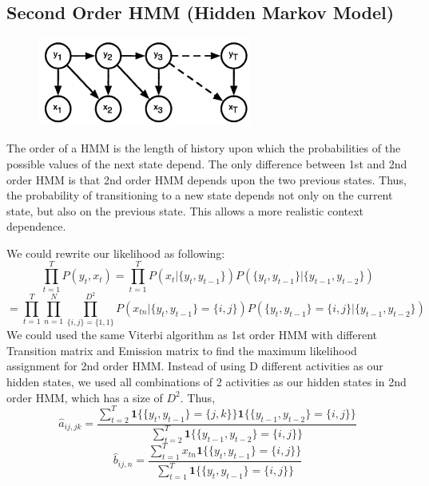 \documentclass[10pt,letter]{article}
\numberwithin{equation}{section} %
\numberwithin{figure}{section} %
\numberwithin{table}{section} %
\begin{document}
\subsection{Second Order HMM (Hidden Markov Model)}

\begin{figure}[h]
    \centering
\includegraphics[width=7cm]{../plot/2hmm}
\end{figure}

The order of a HMM is the length of history upon which the probabilities of the possible values of the next state depend. The only difference between 1st and 2nd order HMM is that 2nd order HMM depends upon the two previous states. Thus, the probability of transitioning to a new state depends not only on the current state, but also on the previous state. This allows a more realistic context dependence.

We could rewrite our likelihood as following:
$$ \prod_{t=1}^{T} P(y_t, x_t) = \prod_{t=1}^T P(x_t|\{y_t, y_{t-1}\})P(\{y_t,y_{t-1}\}|\{y_{t-1},y_{t-2}\})$$
$$=\prod_{t=1}^T\prod_{n=1}^N\prod_{\{i,j\}=\{1,1\}}^{D^2} P(x_{tn}|\{y_t, y_{t-1}\} = \{i,j\})P(\{y_t, y_{t-1}\} = \{i,j\}|\{y_{t-1}, y_{t-2}\}) $$
We could used the same Viterbi algorithm as 1st order HMM with different Transition matrix and Emission matrix to find the maximum likelihood assignment for 2nd order HMM. 
Instead of using D different activities as our hidden states, we used all combinations of 2 activities as our hidden states in 2nd order HMM, which has a size of $D^2$. Thus,
$$\hat{a}_{ij, jk} = \frac{\sum_{t=2}^T \mathbf{1}\{\{y_t,y_{t-1}\}=\{j,k\}\}\mathbf{1}\{\{y_{t-1},y_{t-2}\}=\{i,j\}\}}{\sum_{t=2}^T \mathbf{1}\{\{y_{t-1},y_{t-2}\}=\{i,j\}\}}$$
$$\hat{b}_{ij,n} = \frac{\sum_{t=1}^T x_{tn}\mathbf{1}\{\{y_t,y_{t-1}\}=\{i, j\}\}}{\sum_{t=1}^T \mathbf{1}\{\{y_t,y_{t-1}\}=\{i, j\}\}}$$
\end{document}
